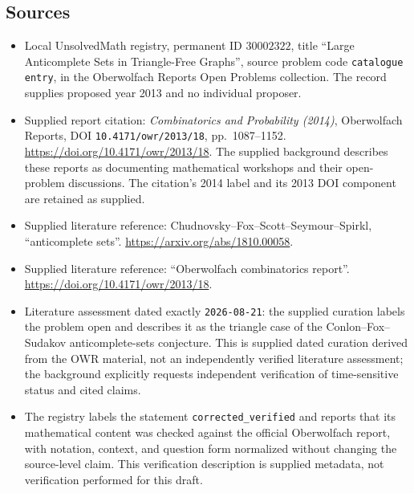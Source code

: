 \documentclass[11pt]{article}
\begin{document}
\subsection{Sources}
\begin{itemize}
\item Local UnsolvedMath registry, permanent ID \(30002322\), title ``Large Anticomplete Sets in Triangle-Free Graphs'', source problem code \texttt{catalogue entry}, in the Oberwolfach Reports Open Problems collection. The record supplies proposed year 2013 and no individual proposer.
\item Supplied report citation: \emph{Combinatorics and Probability (2014)}, Oberwolfach Reports, DOI \texttt{10.4171/owr/2013/18}, pp.\ 1087--1152. \url{https://doi.org/10.4171/owr/2013/18}. The supplied background describes these reports as documenting mathematical workshops and their open-problem discussions. The citation's 2014 label and its 2013 DOI component are retained as supplied.
\item Supplied literature reference: Chudnovsky--Fox--Scott--Seymour--Spirkl, ``anticomplete sets''. \url{https://arxiv.org/abs/1810.00058}.
\item Supplied literature reference: ``Oberwolfach combinatorics report''. \url{https://doi.org/10.4171/owr/2013/18}.
\item Literature assessment dated exactly \texttt{2026-08-21}: the supplied curation labels the problem open and describes it as the triangle case of the Conlon--Fox--Sudakov anticomplete-sets conjecture. This is supplied dated curation derived from the OWR material, not an independently verified literature assessment; the background explicitly requests independent verification of time-sensitive status and cited claims.
\item The registry labels the statement \texttt{corrected\_verified} and reports that its mathematical content was checked against the official Oberwolfach report, with notation, context, and question form normalized without changing the source-level claim. This verification description is supplied metadata, not verification performed for this draft.
\end{itemize}
\end{document}
